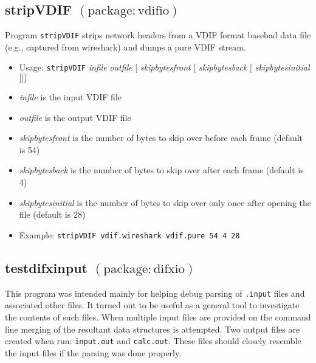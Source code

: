 
\subsection{stripVDIF {\small $\mathrm{(package: vdifio)}$} \label{sec:stripVDIF}}

Program {\tt stripVDIF} strips network headers from a VDIF format basebad data file (e.g., captured from wireshark) and dumps a pure VDIF stream.

\begin{itemize}
\item[] Usage: {\tt stripVDIF} {\em infile} {\em outfile} $[$ {\em skipbytesfront} $[$ {\em skipbytesback} $[$ {\em skipbytesinitial} $] ] ]$

\item[] {\em infile} is the input VDIF file
\item[] {\em outfile} is the output VDIF file
\item[] {\em skipbytesfront} is the number of bytes to skip over before each frame (default is 54)
\item[] {\em skipbytesback} is the number of bytes to skip over after each frame (default is 4)
\item[] {\em skipbytesinitial} is the number of bytes to skip over only once after opening the file (default is 28)

\item[] Example: {\tt stripVDIF vdif.wireshark vdif.pure 54 4 28}
\end{itemize}







\subsection{testdifxinput {\small $\mathrm{(package: difxio)}$}} \label{sec:testdifxinput}

This program was intended mainly for helping debug parsing of {\tt .input} files and associated other files.
It turned out to be useful as a general tool to investigate the contents of such files.
When multiple input files are provided on the command line merging of the resultant data structures is attempted.
Two output files are created when run: {\tt input.out} and {\tt calc.out}.
These files should closely resemble the input files if the parsing was done properly.

